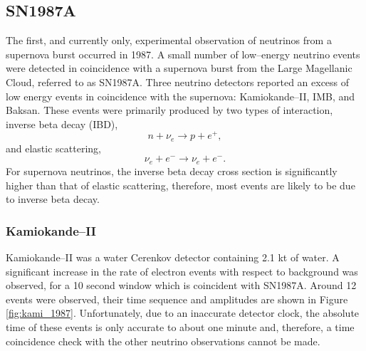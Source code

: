 \subsection{SN1987A}

The first, and currently only, experimental observation of neutrinos from a 
supernova burst occurred in 1987. A small number of low--energy neutrino 
events were detected in coincidence with a supernova burst from the Large 
Magellanic Cloud, referred to as SN1987A. Three neutrino detectors reported an 
excess of low energy events in coincidence with the supernova: Kamiokande--II, 
IMB, and Baksan\cite{Hirata:1987hu, PhysRevLett.58.1494, Loredo:2001rx}. These 
events were primarily produced by two types of interaction, inverse beta decay 
(IBD),
\begin{equation*}
	n + \nu_e \rightarrow p + e^+,
\end{equation*}
and elastic scattering,
\begin{equation*}
	\nu_e + e^- \rightarrow \nu_e + e^-.
\end{equation*}
For supernova neutrinos, the inverse beta decay cross section is significantly 
higher than that of elastic scattering, therefore, most events are likely to be
due to inverse beta decay.

\subsubsection{Kamiokande--II}
Kamiokande--II was a water Cerenkov detector containing 2.1 kt of water. A
significant increase in the rate of electron events with respect to background
was observed, for a 10 second window which is coincident with 
SN1987A\cite{Hirata:1987hu}. Around 12 events were observed, their time sequence
and amplitudes are shown in Figure \ref{fig:kami_1987}. Unfortunately, due to 
an inaccurate detector clock, the absolute time of these events is only 
accurate to about one minute and, therefore, a time coincidence check with the 
other neutrino observations cannot be made.

